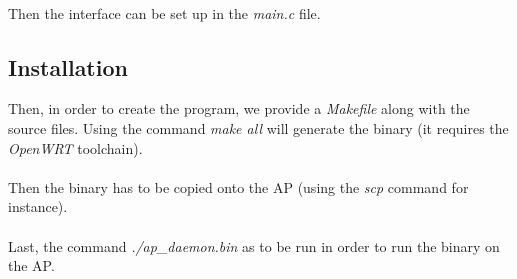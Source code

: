 \paragraph{}
Then the interface can be set up in the \emph{main.c} file.

\subsection{Installation}

Then, in order to create the program, we provide a \emph{Makefile} along with
the source files. Using the command \emph{make all} will generate the binary
(it requires the \emph{OpenWRT} toolchain).

\paragraph{}
Then the binary has to be copied onto the AP (using the \emph{scp} command for
instance).

\paragraph{}
Last, the command \emph{./ap\_daemon.bin} as to be run in order to run the
binary on the AP.
